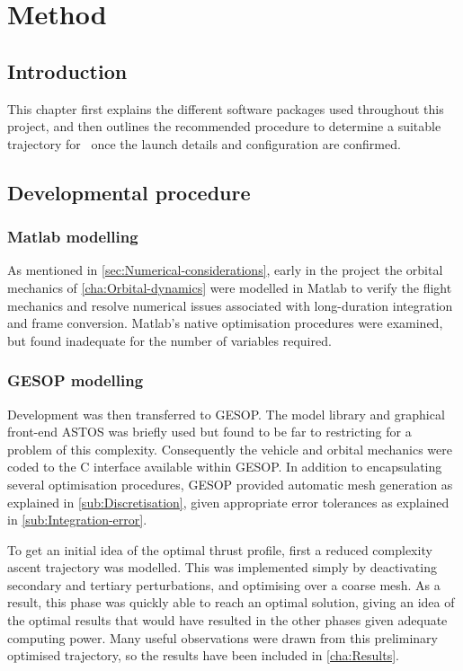 \chapter{Method} \label{cha:Method}

\section{Introduction} \label{sec:Method-intro}

This chapter first explains the different software packages used throughout this project, and then outlines the recommended procedure to determine a suitable trajectory for \BW\ once the launch details and configuration are confirmed.

\section{Developmental procedure} \label{sec:Development}

\subsection{Matlab modelling} \label{sub:Matlab}

As mentioned in \autoref{sec:Numerical-considerations}, early in the project the orbital mechanics of \autoref{cha:Orbital-dynamics} were modelled in Matlab to verify the flight mechanics and resolve numerical issues associated with long-duration integration and frame conversion. Matlab's native optimisation procedures were examined, but found inadequate for the number of variables required.

\subsection{GESOP modelling} \label{sub:GESOP}

Development was then transferred to GESOP. The model library and graphical front-end ASTOS was briefly used but found to be far to restricting for a problem of this complexity. Consequently the vehicle and orbital mechanics were coded to the C interface available within GESOP. In addition to encapsulating several optimisation procedures, GESOP provided automatic mesh generation as explained in \autoref{sub:Discretisation}, given appropriate error tolerances as explained in \autoref{sub:Integration-error}.

To get an initial idea of the optimal thrust profile, first a reduced complexity ascent trajectory was modelled. This was implemented simply by deactivating secondary and tertiary perturbations, and optimising over a coarse mesh. As a result, this phase was quickly able to reach an optimal solution, giving an idea of the optimal results that would have resulted in the other phases given adequate computing power. Many useful observations were drawn from this preliminary optimised trajectory, so the results have been included in \autoref{cha:Results}.

